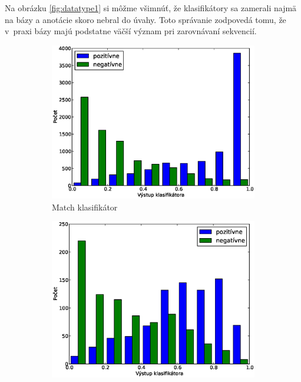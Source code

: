 Na obrázku \ref{fig:datatype1} si môžme všimnúť, že klasifikátory sa zamerali najmä na bázy a anotácie skoro nebral do úvahy.
Toto správanie zodpovedá tomu, že v~praxi bázy majú podstatne väčší význam pri zarovnávaní sekvencií.

\begin{figure}[htp]
        \centering
        \begin{subfigure}[t]{0.4\textwidth}
                \includegraphics[width=\textwidth]{images/clf_fi/randomforest5_test}
                \caption{Match klasifikátor}
                \label{fig:datatype1-out-m}
        \end{subfigure}%
        \qquad\qquad %
        \begin{subfigure}[t]{0.4\textwidth}
                \includegraphics[width=\textwidth]{images/clf_fi/randomforest5_indel_test}

\end{subfigure}
\end{figure}
